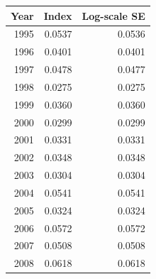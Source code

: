 \documentclass[12pt,]{article}
\begin{document}
\begin{table}[ht]
\begin{tabular}{rrr}
  \hline
Year & Index & Log-scale SE \\ 
  \hline
 1995 & 0.0537 & 0.0536 \\ 
   1996 & 0.0401 & 0.0401 \\ 
   1997 & 0.0478 & 0.0477 \\ 
   1998 & 0.0275 & 0.0275 \\ 
   1999 & 0.0360 & 0.0360 \\ 
   2000 & 0.0299 & 0.0299 \\ 
   2001 & 0.0331 & 0.0331 \\ 
   2002 & 0.0348 & 0.0348 \\ 
   2003 & 0.0304 & 0.0304 \\ 
   2004 & 0.0541 & 0.0541 \\ 
   2005 & 0.0324 & 0.0324 \\ 
   2006 & 0.0572 & 0.0572 \\ 
   2007 & 0.0508 & 0.0508 \\ 
   2008 & 0.0618 & 0.0618 \\ 
   \hline
\end{tabular}
\end{table}

\FloatBarrier
\end{document}
